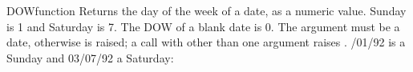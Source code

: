 \begin{XbaseEntry}{DOW}{function}
Returns the day of the week of a date, as a numeric value.
\Syntax
{}
\Usage
Sunday is 1 and Saturday is 7. The DOW of a blank date is 0. The argument must be a date, otherwise  is raised; a call with other than one argument raises .
/01/92 is a Sunday and 03/07/92 a Saturday:
\end{XbaseEntry}

